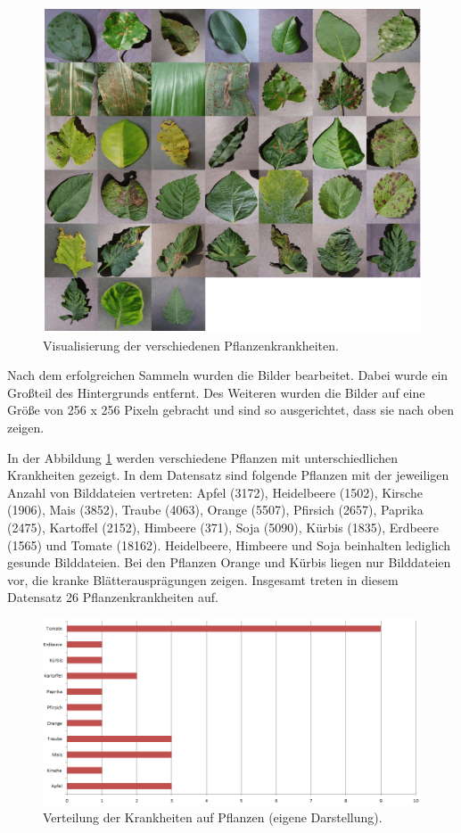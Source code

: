 \begin{figure}[h!]
	\centering
	\includegraphics[width=\textwidth]{bilder/data_visualized}
	\caption{Visualisierung der verschiedenen Pflanzenkrankheiten\cite{crowdai}.}
	\label{data_visualized}
\end{figure}
Nach dem erfolgreichen Sammeln wurden die Bilder bearbeitet. Dabei wurde ein Großteil des Hintergrunds entfernt. Des Weiteren wurden die Bilder auf eine Größe von 256 x 256 Pixeln gebracht und sind so ausgerichtet, dass sie nach oben zeigen.

In der Abbildung \ref{data_visualized} werden verschiedene Pflanzen mit unterschiedlichen Krankheiten gezeigt.
In dem Datensatz sind folgende Pflanzen mit der jeweiligen Anzahl von Bilddateien vertreten: Apfel (3172), Heidelbeere (1502), Kirsche (1906), Mais (3852), Traube (4063), Orange (5507), Pfirsich (2657), Paprika (2475), Kartoffel (2152), Himbeere (371), Soja (5090), Kürbis (1835), Erdbeere (1565) und Tomate (18162). Heidelbeere, Himbeere und Soja beinhalten lediglich gesunde Bilddateien. Bei den Pflanzen Orange und Kürbis liegen nur Bilddateien vor, die kranke Blätterausprägungen zeigen. Insgesamt treten in diesem Datensatz 26 Pflanzenkrankheiten auf.

\begin{figure}[h!]
	\centering
	\includegraphics[width=\textwidth]{bilder/disease_distribution}
	\caption{Verteilung der Krankheiten auf Pflanzen (eigene Darstellung).}
	\label{disease_distribution}
\end{figure}

